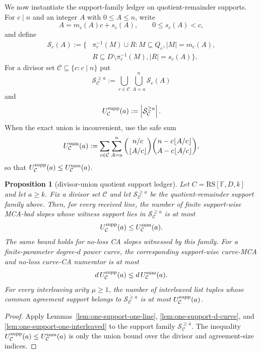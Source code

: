 \documentclass[11pt]{article}
\newtheorem{proposition}[theorem]{Proposition}
\theoremstyle{definition}
\theoremstyle{remark}
\newcommand{\F}{\mathbb{F}}
\newcommand{\RS}{\mathrm{RS}}
\begin{document}
We now instantiate the support-family ledger on quotient-remainder supports.  For
$c\mid n$ and an integer $A$ with $0\le A\le n$, write
\[
        A=m_c(A)c+s_c(A),\qquad 0\le s_c(A)<c,
\]
and define
\[
\begin{aligned}
        \mathcal S_c(A)
        :=\{&\pi_c^{-1}(M)\cup R:
          M\subseteq Q_c,
          |M|=m_c(A),\\
        & R\subseteq D\setminus\pi_c^{-1}(M),
          |R|=s_c(A)\} .
\end{aligned}
\]
For a divisor set $\mathcal C\subseteq\{c:c\mid n\}$ put
\[
        \mathcal S_{\mathcal C}^{\ge a}
        :=\bigcup_{c\in\mathcal C}\bigcup_{A=a}^n \mathcal S_c(A)
\]
and
\[
        U_{\mathcal C}^{\rm supp}(a)
        :=\left|\mathcal S_{\mathcal C}^{\ge a}\right|.
\]
When the exact union is inconvenient, use the safe sum
\[
\label{eq:quotient-support-safe-sum}
        U_{\mathcal C}^{\rm sum}(a)
        :=\sum_{c\in\mathcal C}\sum_{A=a}^n
          \binom{n/c}{\lfloor A/c\rfloor}
          \binom{n-c\lfloor A/c\rfloor}{A-c\lfloor A/c\rfloor},
\]
so that $U_{\mathcal C}^{\rm supp}(a)\le U_{\mathcal C}^{\rm sum}(a)$.

\begin{proposition}[divisor-union quotient support ledger]
\label{prop:divisor-union-support-ledger}
Let $C=\RS[\F,D,k]$ and let $a\ge k$.  Fix a divisor set $\mathcal C$ and let
$\mathcal S_{\mathcal C}^{\ge a}$ be the quotient-remainder support family above.
Then, for every received line, the number of finite support-wise MCA-bad slopes
whose witness support lies in $\mathcal S_{\mathcal C}^{\ge a}$ is at most
\[
        U_{\mathcal C}^{\rm supp}(a)
        \le U_{\mathcal C}^{\rm sum}(a).
\]
The same bound holds for no-loss CA slopes witnessed by this family.  For a
finite-parameter degree-$d$ power curve, the corresponding support-wise curve-MCA
and no-loss curve-CA numerator is at most
\[
        d\,U_{\mathcal C}^{\rm supp}(a)
        \le d\,U_{\mathcal C}^{\rm sum}(a).
\]
For every interleaving arity $\mu\ge1$, the number of interleaved list tuples whose
common agreement support belongs to $\mathcal S_{\mathcal C}^{\ge a}$ is at most
$U_{\mathcal C}^{\rm supp}(a)$.
\end{proposition}

\begin{proof}
Apply Lemmas~\ref{lem:one-support-one-line}, \ref{lem:one-support-d-curve}, and
\ref{lem:one-support-one-interleaved} to the support family
$\mathcal S_{\mathcal C}^{\ge a}$.  The inequality
$U_{\mathcal C}^{\rm supp}(a)\le U_{\mathcal C}^{\rm sum}(a)$ is only the union
bound over the divisor and agreement-size indices.
\end{proof}
\end{document}
